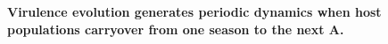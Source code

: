 \documentclass{article}
\begin{document}
\begin{figure}[hb!]
  \centering
    \begin{subfigure}[t]{0.45\textwidth}
      \centering
  \end{subfigure}\hspace{1cm}
  \begin{subfigure}[t]{0.45\textwidth}\hspace{0cm}
  \end{subfigure}\hspace{1.5cm}
    \caption{\textbf{Virulence evolution generates periodic dynamics when host populations carryover from one season to the next A.}
}
\end{figure}
\end{document}
